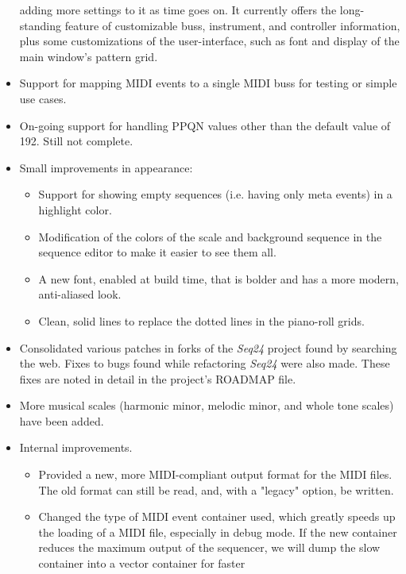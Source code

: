 \documentclass[
 11pt,
 twoside,
 a4paper,
 headinclude,
 footinclude,
 final                                 %
]{article}
\begin{document}
\begin{itemize}
         adding more settings to it as time goes on.  It currently offers the
         long-standing feature of customizable buss, instrument, and controller
         information, plus some customizations of the user-interface, such as
         font and display of the main window's pattern grid.
      \item Support for mapping MIDI events to a single MIDI buss for testing
         or simple use cases.
      \item On-going support for handling PPQN values other than the
         default value of 192.  Still not complete.
      \item Small improvements in appearance:
      \begin{itemize}
         \item Support for showing empty sequences (i.e. having only meta
            events) in a highlight color.
         \item Modification of the colors of the scale and background sequence
            in the sequence editor to make it easier to see them all.
         \item A new font, enabled at build time, that is bolder and has a
            more modern, anti-aliased look.
         \item Clean, solid lines to replace the dotted lines in the piano-roll
            grids.
      \end{itemize}
      \item Consolidated various patches in forks of the \textsl{Seq24}
         project found by searching the web.  Fixes to bugs found while
         refactoring \textsl{Seq24} were also made.  These fixes are noted in
         detail in the project's ROADMAP file.
      \item More musical scales (harmonic minor, melodic minor, and
         whole tone scales) have been added.
      \item Internal improvements.
      \begin{itemize}
         \item Provided a new, more MIDI-compliant output format for the MIDI
            files.  The old format can still be read, and, with a "legacy" option,
            be written.
         \item Changed the type of MIDI event container used, which greatly speeds
            up the loading of a MIDI file, especially in debug mode.
            If the new container reduces the maximum output of the sequencer,
            we will dump the slow container into a vector container for faster

\end{itemize}
\end{itemize}
\end{document}
